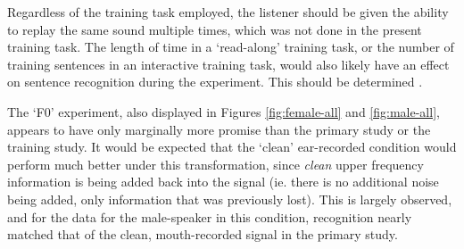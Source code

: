 Regardless of the training task employed, the listener should be given the ability to replay the same sound multiple times, which was not done in the present training task.  The length of time in a `read-along' training task, or the number of training sentences in an interactive training task, would also likely have an effect on sentence recognition during the experiment.  This should be determined \DIFdelbegin {}\DIFdelend \DIFaddbegin {}\DIFaddend .

% 


The `F0' experiment, also displayed in Figures \ref{fig:female-all} and \ref{fig:male-all}, appears to have only marginally more promise than the primary study or the training study.  It would be expected that the `clean' ear-recorded condition would perform much better under this transformation, since \textit{clean} upper frequency information is being added back into the signal (ie. there is no additional noise being added, only information that was previously lost).  This is largely observed, and for the data for the male-speaker in this condition, recognition nearly matched that of the clean, mouth-recorded signal in the primary study.  \DIFaddbegin {}\DIFaddend 

